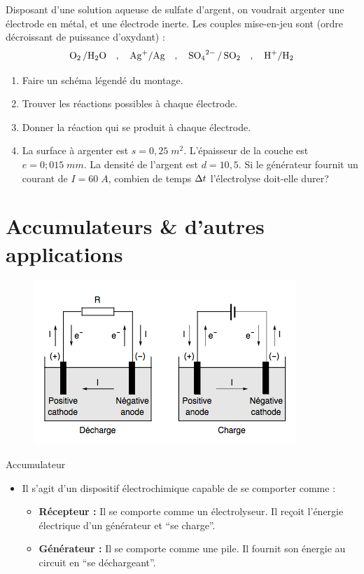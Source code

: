 \documentclass[11pt,a4paper]{article}
\begin{document}
\begin{exo}
Disposant d'une solution aqueuse de sulfate d'argent, on voudrait argenter une électrode en métal, et une électrode inerte. Les couples mise-en-jeu sont (ordre décroissant de puissance d'oxydant) :
$$\ce{O2 /H2O}\quad , \quad \ce{Ag+/Ag}\quad , \quad \ce{SO4^2- / SO2} \quad , \quad \ce{H+/H2}  $$ 
\begin{enumerate}
    \item Faire un schéma légendé du montage. 
    \item Trouver les réactions possibles à chaque électrode.
    \item Donner la réaction qui se produit à chaque électrode. 
    \item La surface à argenter est $s=0,25\;m^2$. L'épaisseur de la couche est $e=0;015\;mm$. La densité de l'argent est $d=10,5$. Si le générateur fournit un courant de $I=60\;A$, combien de temps $\Delta t$ l'électrolyse doit-elle durer?
\end{enumerate}
\vspace{7cm}
\end{exo}

\section{Accumulateurs \& d'autres applications}

\begin{figure}
\centering
\includegraphics[width=0.95\linewidth]{imgs/c6/accumul.png}
\end{figure}

\begin{defn}{Accumulateur}
\begin{itemize}
    \item Il s'agit d'un dispositif électrochimique capable de se comporter comme : 
    \begin{itemize}
        \item \textbf{Récepteur : } Il se comporte comme un électrolyseur. Il reçoit l'énergie électrique d'un générateur et ``se charge''. 
        \item \textbf{Générateur : } Il se comporte comme une pile. Il fournit son énergie au circuit en ``se déchargeant''. 
    \end{itemize}
\end{itemize}
\end{defn}
\end{document}
